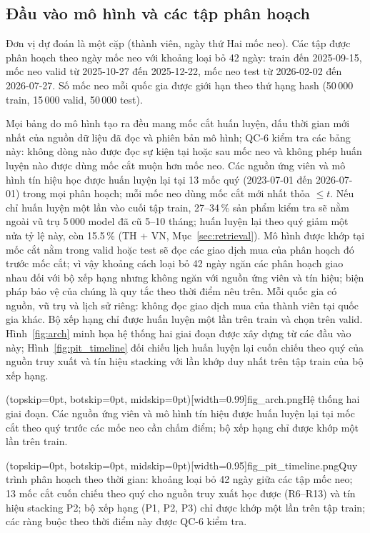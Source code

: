 \documentclass[jtehm]{ieeeaccess}
\begin{document}
\subsection{Đầu vào mô hình và các tập phân hoạch}
Đơn vị dự đoán là một cặp (thành viên, ngày thứ Hai mốc neo). Các tập được phân hoạch theo ngày mốc neo với khoảng loại bỏ 42 ngày: train đến 2025-09-15, mốc neo valid từ 2025-10-27 đến 2025-12-22, mốc neo test từ 2026-02-02 đến 2026-07-27. Số mốc neo mỗi quốc gia được giới hạn theo thứ hạng hash (50\,000 train, 15\,000 valid, 50\,000 test).

Mọi bảng do mô hình tạo ra đều mang mốc cắt huấn luyện, dấu thời gian mới nhất của nguồn dữ liệu đã đọc và phiên bản mô hình; QC-6 kiểm tra các bảng này: không dòng nào được đọc sự kiện tại hoặc sau mốc neo và không phép huấn luyện nào được dùng mốc cắt muộn hơn mốc neo. Các nguồn ứng viên và mô hình tín hiệu học được huấn luyện lại tại 13 mốc quý (2023-07-01 đến 2026-07-01) trong mọi phân hoạch; mỗi mốc neo dùng mốc cắt mới nhất thỏa $\le t$. Nếu chỉ huấn luyện một lần vào cuối tập train, 27--34\,\% sản phẩm kiểm tra sẽ nằm ngoài vũ trụ 5\,000 model đã cũ 5--10 tháng; huấn luyện lại theo quý giảm một nửa tỷ lệ này, còn 15.5\,\% (TH + VN, Mục~\ref{sec:retrieval}). Mô hình được khớp tại mốc cắt nằm trong valid hoặc test sẽ đọc các giao dịch mua của phân hoạch đó trước mốc cắt; vì vậy khoảng cách loại bỏ 42 ngày ngăn các phân hoạch giao nhau đối với bộ xếp hạng nhưng không ngăn với nguồn ứng viên và tín hiệu; biện pháp bảo vệ của chúng là quy tắc theo thời điểm nêu trên. Mỗi quốc gia có nguồn, vũ trụ và lịch sử riêng: không đọc giao dịch mua của thành viên tại quốc gia khác. Bộ xếp hạng chỉ được huấn luyện một lần trên train và chọn trên valid. Hình~\ref{fig:arch} minh họa hệ thống hai giai đoạn được xây dựng từ các đầu vào này; Hình~\ref{fig:pit_timeline} đối chiếu lịch huấn luyện lại cuốn chiếu theo quý của nguồn truy xuất và tín hiệu stacking với lần khớp duy nhất trên tập train của bộ xếp hạng.

\Figure[t!](topskip=0pt, botskip=0pt, midskip=0pt)[width=0.99\columnwidth]{fig_arch.png}{Hệ thống hai giai đoạn. Các nguồn ứng viên và mô hình tín hiệu được huấn luyện lại tại mốc cắt theo quý trước các mốc neo cần chấm điểm; bộ xếp hạng chỉ được khớp một lần trên train.\label{fig:arch}}

\Figure[t!](topskip=0pt, botskip=0pt, midskip=0pt)[width=0.95\textwidth]{fig_pit_timeline.png}{Quy trình phân hoạch theo thời gian: khoảng loại bỏ 42 ngày giữa các tập mốc neo; 13 mốc cắt cuốn chiếu theo quý cho nguồn truy xuất học được (R6--R13) và tín hiệu stacking P2; bộ xếp hạng (P1, P2, P3) chỉ được khớp một lần trên tập train; các ràng buộc theo thời điểm này được QC-6 kiểm tra.\label{fig:pit_timeline}}
\end{document}
